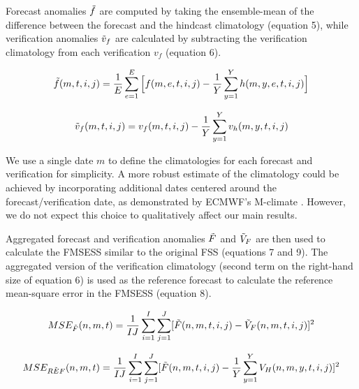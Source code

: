 \documentclass[preprint,12pt,authoryear]{elsarticle}
\begin{document}
Forecast anomalies $\Tilde{f}$ are computed by taking the ensemble-mean of the difference between the forecast and the hindcast climatology (equation 5), while verification anomalies $\Tilde{v}_{f}$ are calculated by subtracting the verification climatology from each verification $v_{f}$ (equation 6). 


\begin{equation}
    \Tilde{f}(m,t,i,j) = \frac{1}{E}\sum_{e=1}^{E} \Big[f(m,e,t,i,j) - \frac{1}{Y} \sum_{y=1}^{Y} h(m,y,e,t,i,j)\Big] 
\end{equation}

\begin{equation}
    \Tilde{v}_{f}(m,t,i,j) = v_{f}(m,t,i,j) - \frac{1}{Y} \sum_{y=1}^{Y} v_{h}(m,y,t,i,j) 
\end{equation}


We use a single date $m$ to define the climatologies for each forecast and verification for simplicity. A more robust estimate of the climatology could be achieved by incorporating additional dates centered around the forecast/verification date, as demonstrated by ECMWF's M-climate \citep{ECMWFb}. However, we do not expect this choice to qualitatively affect our main results.  


Aggregated forecast and verification anomalies $\Tilde{F}$ and $\Tilde{V}_{F}$ are then used to calculate the FMSESS similar to the original FSS (equations 7 and 9). The aggregated version of the verification climatology (second term on the right-hand size of equation 6) is used as the reference forecast to calculate the reference mean-square error in the FMSESS (equation 8).

\begin{equation}
    MSE_{\Tilde{F}}(n, m, t) = \frac{1}{IJ} \sum_{i=1}^{I}\sum_{j=1}^{J} [\Tilde{F}(n,m,t,i,j) - \Tilde{V}_{F}(n,m,t,i,j)]^{2}
\end{equation}

\begin{equation}
    MSE_{\Tilde{REF}}(n, m, t) = \frac{1}{IJ} \sum_{i=1}^{I}\sum_{j=1}^{J} [\Tilde{F}(n,m,t,i,j) - \frac{1}{Y} \sum_{y=1}^{Y} V_{H}(n, m,y,t,i,j) ]^{2}
\end{equation}
\end{document}
